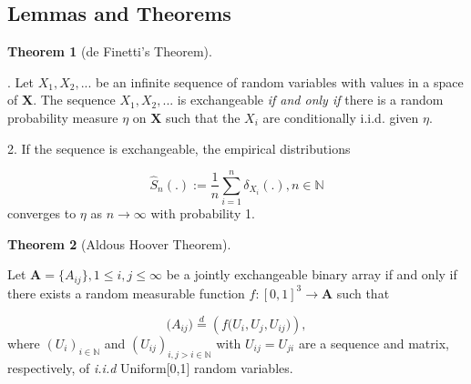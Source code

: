 \documentclass[12pt]{article}
\theoremstyle{definition}
\newtheorem{theorem}{Theorem}[section]
\begin{document}
\newpage
\subsection{Lemmas and Theorems}
	
\begin{theorem}[de Finetti's Theorem] 
	\label{finetti}
	
. Let $X_{1}, X_{2}, ...$ be an infinite sequence of random variables with values in a space of $\mathbf{X}$. The sequence $X_{1}, X_{2}, ...$ is exchangeable \textit{if and only if} there is a random probability measure $\eta$ on $\mathbf{X}$ such that the $X_{i}$ are conditionally i.i.d. given $\eta$. 
		
2. If the sequence is exchangeable, the empirical distributions
		
$$\hat{S}_{n} ( . ) := \frac{1}{n} \sum\limits_{i=1}^{n} \delta_{X_{i}} ( .), n \in \mathbb{N}$$
		converges to $\eta$ as $n \rightarrow \infty$ with probability 1.
\end{theorem}
	
\begin{theorem}[Aldous Hoover Theorem]
		\label{Aldous_Hoover}
		
		Let $\mathbf{A} = \{A_{ij}\}, 1 \leq i,j \leq \infty$ be a jointly exchangeable binary array if and only if there exists a random measurable function $f : [0,1]^{3} \rightarrow \mathbf{A}$ such that 
		
		\begin{equation}
		\big(  A_{ij}  \big) \stackrel{d}{=} \left( f \big( U_{i}, U_{j}, U_{ij} \big)  \right),
		\end{equation}
		where $(U_{i})_{i \in \mathbb{N}}$ and $(U_{ij})_{i,j > i \in \mathbb{N}}$ with $U_{ij} = U_{ji}$ are a sequence and matrix, respectively, of \textit{i.i.d} Uniform[0,1] random variables. 
\end{theorem}
	
\end{document}
